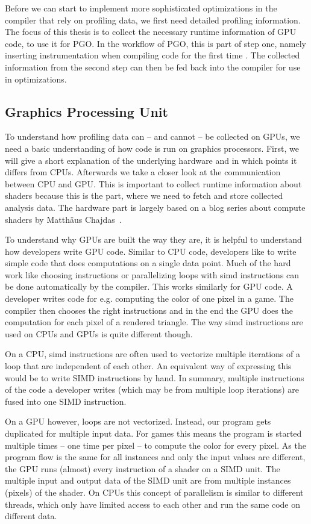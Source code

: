 Before we can start to implement more sophisticated optimizations in the compiler that rely on profiling data, we first need detailed profiling information. The focus of this thesis is to collect the necessary runtime information of GPU code, to use it for PGO. In the workflow of PGO, this is part of step one, namely inserting instrumentation when compiling code for the first time%
. The collected information from the second step can then be fed back into the compiler for use in optimizations.

\subsection{Graphics Processing Unit}
To understand how profiling data can -- and cannot -- be collected on GPUs, we need a basic understanding of how code is run on graphics processors. First, we will give a short explanation of the underlying hardware and in which points it differs from CPUs. Afterwards we take a closer look at the communication between CPU and GPU. This is important to collect runtime information about shaders because this is the part, where we need to fetch and store collected analysis data. The hardware part is largely based on a blog series about compute shaders by Matthäus Chajdas~\cite{Chajdas2018}.

To understand why GPUs are built the way they are, it is helpful to understand how developers write GPU code. Similar to CPU code, developers like to write simple code that does computations on a single data point. Much of the hard work like choosing instructions or parallelizing loops with \gls{simd} instructions can be done automatically by the compiler. This works similarly for GPU code. A developer writes code for e.g. computing the color of one pixel in a game. The compiler then chooses the right instructions and in the end the GPU does the computation for each pixel of a rendered triangle. The way \gls{simd} instructions are used on CPUs and GPUs is quite different though.

On a CPU, \gls{simd} instructions are often used to vectorize multiple iterations of a loop that are independent of each other. An equivalent way of expressing this would be to write SIMD instructions by hand. In summary, multiple instructions of the code a developer writes (which may be from multiple loop iterations) are fused into one SIMD instruction.

On a GPU however, loops are not vectorized. Instead, our program gets duplicated for multiple input data. For games this means the program is started multiple times -- one time per pixel -- to compute the color for every pixel. As the program flow is the same for all instances and only the input values are different, the GPU runs (almost) every instruction of a shader on a SIMD unit. The multiple input and output data of the SIMD unit are from multiple instances (pixels) of the shader. On CPUs this concept of parallelism is similar to different threads, which only have limited access to each other and run the same code on different data.

